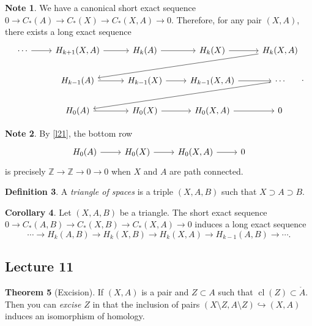 \documentclass[10pt,letterpaper,cm]{nupset}
\theoremstyle{definition}
\newtheorem{definition}{Definition}[subsection]
\newtheorem{note}[definition]{Note}
\theoremstyle{theorem}
\newtheorem{theorem}[definition]{Theorem}
\newtheorem{corollary}[definition]{Corollary}
\theoremstyle{remark}
\newcommand{\Z}{\mathbb Z}
\newcommand{\1}{\mathbb{1}}
\newcommand{\0}{\vec 0}
\DeclareMathOperator{\cl}{cl}
\begin{document}
\begin{note}\label{c11}
We have a canonical short exact sequence $0 \to C_{\ast}(A) \to C_{\ast}(X) \to C_{\ast}(X,A) \to 0$. Therefore, for any pair $(X,A)$, there exists a long exact sequence
\[
\begin{tikzcd}
\cdots \arrow[r] & {H_{k+1}(X,A)} \arrow[r] & H_k(A) \arrow[r]     & H_k(X) \arrow[r]         & {H_k(X,A)} \arrow[llld] \\
                 & H_{k-1}(A) \arrow[r]     & H_{k-1}(X) \arrow[r] & {H_{k-1}(X,A)} \arrow[r] & \cdots \arrow[llld]     \\
                 & H_0(A) \arrow[r]         & H_0(X) \arrow[r]     & {H_0(X,A)} \arrow[r]     & 0                      
\end{tikzcd}
.\]
\end{note}

\begin{note} By \cref{l21}, the bottom row
\[
\begin{tikzcd}
H_0(A) \arrow[r]         & H_0(X) \arrow[r]     & {H_0(X,A)} \arrow[r]     & 0
\end{tikzcd}
\] is precisely $\Z \to \Z \to 0 \to 0$ when $X$ and $A$ are path connected.
\end{note}

\begin{definition}
A \textit{triangle of spaces} is a triple $(X, A, B)$ such that $X \supset A \supset B$.
\end{definition}

\begin{corollary}\label{c12}
Let $(X, A, B)$ be a triangle. The short exact sequence $0 \to C_{\ast}(A, B) \to C_{\ast}(X, B) \to C_{\ast}(X, A) \to 0$ induces a long exact sequence $$ \cdots \to  H_k(A, B) \to H_k(X, B) \to H_k(X, A) \to H_{k-1}(A, B) \to \cdots   .$$
\end{corollary}

\subsection{Lecture 11}

\begin{theorem}[Excision]\label{excision}
If $(X, A)$ is a pair and $Z\subset A$ such that $\cl(Z) \subset \mathring{A}$. Then you can \textit{excise} $Z$ in that the inclusion of pairs $(X\setminus Z, A \setminus Z) \hookrightarrow (X, A)$ induces an isomorphism of homology. 
\end{theorem}
\end{document}
